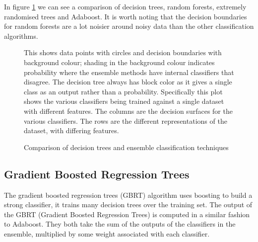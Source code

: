 \documentclass[ %
                    author={Sam Phippen},
                supervisor={Dr. Rafal Bogacz},
                     title={Real time voice activity detectors in noisy personal computing environments},
                  subtitle={},
                    degree={MEng},
                      year={2012} ]{thesis}
\begin{document}
In figure \ref{fig:comparison} we can see a comparison of decision trees,
random forests, extremely randomised trees and Adaboost. It is worth noting
that the decision boundaries for random forests are a lot noisier around noisy
data than the other classification algorithms.

\begin{figure}

    \caption{Comparison
    of decision trees and ensemble classification techniques}

    This shows data points with circles and decision boundaries with background
    colour; shading in the background colour indicates probability where the
    ensemble methods have internal classifiers that disagree. The decision tree
    always has block color as it gives a single class as an output rather than
    a probability. Specifically this plot shows the various classifiers being
    trained against a single dataset with different features. The columns
    are the decision surfaces for the various classifiers. The rows are the
    different representations of the dataset, with differing features.

    \label{fig:comparison}

\end{figure}

\subsection{Gradient Boosted Regression Trees}

The gradient boosted regression trees (GBRT) algorithm uses boosting to build a
strong classifier, it trains many decision trees over the training set.  The
output of the GBRT (Gradient Boosted Regression Trees) is computed in a similar
fashion to Adaboost. They both take the sum of the outputs of the classifiers
in the ensemble, multiplied by some weight associated with each classifier. 
\end{document}
